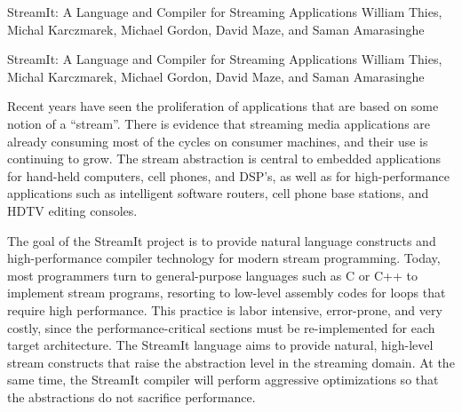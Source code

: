 

\formattitle%
  {StreamIt: A Language and Compiler for Streaming Applications}
  {William Thies, Michal Karczmarek, Michael Gordon, David Maze, and
  Saman Amarasinghe}

\formatcontents%
  {StreamIt: A Language and Compiler for Streaming Applications}
  {William Thies, Michal Karczmarek, Michael Gordon, David Maze, and
  Saman Amarasinghe}

%

Recent years have seen the proliferation of applications that are
based on some notion of a ``stream''.  There is evidence that
streaming media applications are already consuming most of the cycles
on consumer machines, and their use is continuing to grow.  The stream
abstraction is central to embedded applications for hand-held
computers, cell phones, and DSP's, as well as for high-performance
applications such as intelligent software routers, cell phone base
stations, and HDTV editing consoles.

The goal of the StreamIt project is to provide natural language
constructs and high-performance compiler technology for modern stream
programming.  Today, most programmers turn to general-purpose
languages such as C or C++ to implement stream programs, resorting to
low-level assembly codes for loops that require high performance.
This practice is labor intensive, error-prone, and very costly, since
the performance-critical sections must be re-implemented for each
target architecture.  The StreamIt language aims to provide natural,
high-level stream constructs that raise the abstraction level in the
streaming domain.  At the same time, the StreamIt compiler will
perform aggressive optimizations so that the abstractions do not
sacrifice performance.

